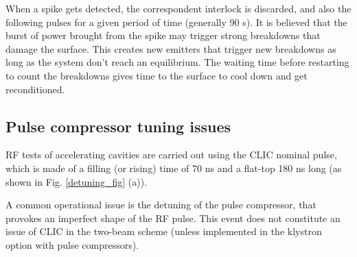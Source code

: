When a spike gets detected, the correspondent interlock is discarded, and also the following pulses for a given period of time (generally 90 s). It is believed that the burst of power brought from the spike may trigger strong breakdowns that damage the surface. This creates new emitters that trigger new breakdowns as long as the system don't reach an equilibrium. The waiting time before restarting to count the breakdowns gives time to the surface to cool down and get reconditioned.


\subsection[Pulse compressor tuning issues]{Pulse compressor tuning issues}
\label{sec:PCtune}

RF tests of accelerating cavities are carried out using the CLIC nominal pulse, which is made of a filling (or rising) time of 70 ns and a flat-top 180 ns long (as shown in Fig. \ref{detuning_fig} (a)).

A common operational issue is the detuning of the pulse compressor, that provokes an imperfect shape of the RF pulse. This event does not constitute an issue of CLIC in the two-beam scheme (unless implemented in the klystron option with pulse compressors). 

